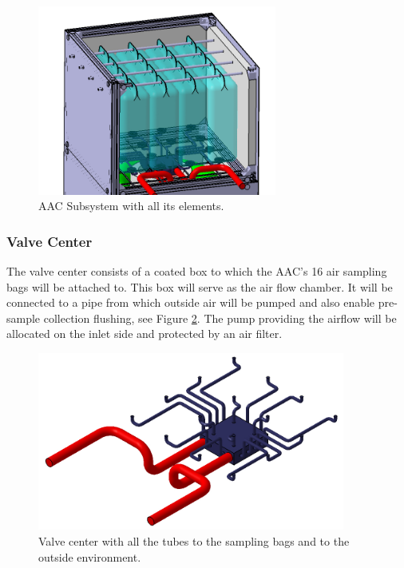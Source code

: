 
\begin{figure}[!ht]
    \centering
    \includegraphics[width=0.7\textwidth]{4-experiment-design/img/anchored_bags.jpg}
    \caption{AAC Subsystem with all its elements.}
    \label{anchor_bags}
\end{figure}

\pagebreak
\subsubsection{Valve Center}

The valve center consists of a coated box to which the AAC's 16 air sampling bags will be attached to. This box will serve as the air flow chamber. It will be connected to a pipe from which outside air will be pumped and also enable pre-sample collection flushing, see Figure \ref{valve_center_and_pipes}. The pump providing the airflow will be allocated on the inlet side and protected by an air filter. 


\begin{figure}[!ht]
    \centering
    \includegraphics[width=0.9\textwidth]{4-experiment-design/img/valve_collector.jpg}
    \caption{Valve center with all the tubes to the sampling bags and to the outside environment.}
    \label{valve_center_and_pipes}
\end{figure}


